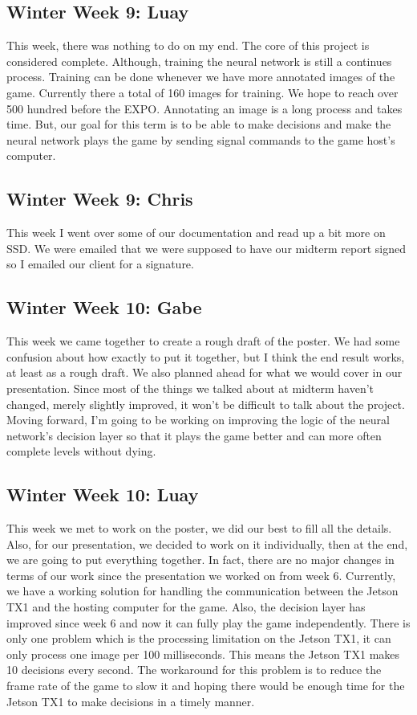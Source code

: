 \documentclass[onecolumn, draftclsnofoot,10pt, compsoc]{IEEEtran}
\begin{document}
\subsection{Winter Week 9: Luay}
This week, there was nothing to do on my end. The core of this project is considered complete. Although, training the neural network is still a continues process. Training can be done whenever we have more annotated images of the game. Currently there a total of 160 images for training. We hope to reach over 500 hundred before the EXPO. Annotating an image is a long process and takes time. But, our goal for this term is to be able to make decisions and make the neural network plays the game by sending signal commands to the game host's computer.
\subsection{Winter Week 9: Chris}
This week I went over some of our documentation and read up a bit more on SSD. We were emailed that we were supposed to have our midterm report signed so I emailed our client for a signature.
\subsection{Winter Week 10: Gabe}
This week we came together to create a rough draft of the poster. We had some confusion about how exactly to put it together, but I think the end result works, at least as a rough draft. We also planned ahead for what we would cover in our presentation. Since most of the things we talked about at midterm haven't changed, merely slightly improved, it won't be difficult to talk about the project. Moving forward, I'm going to be working on improving the logic of the neural network's decision layer so that it plays the game better and can more often complete levels without dying.
\subsection{Winter Week 10: Luay}
This week we met to work on the poster, we did our best to fill all the details. Also, for our presentation, we decided to work on it individually, then at the end, we are going to put everything together. In fact, there are no major changes in terms of our work since the presentation we worked on from week 6. Currently, we have a working solution for handling the communication between the Jetson TX1 and the hosting computer for the game. Also, the decision layer has improved since week 6 and now it can fully play the game independently. There is only one problem which is the processing limitation on the Jetson TX1, it can only process one image per 100 milliseconds. This means the Jetson TX1 makes 10 decisions every second. The workaround for this problem is to reduce the frame rate of the game to slow it and hoping there would be enough time for the Jetson TX1 to make decisions in a timely manner.
\end{document}
